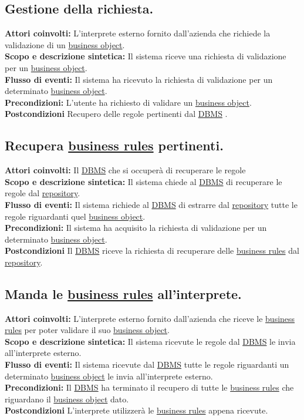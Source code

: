 \subsection{Gestione della richiesta.}
\textbf{Attori coinvolti:} L'interprete esterno fornito dall'azienda che richiede la validazione di un \underline{business object}.\\
\textbf{Scopo e descrizione sintetica:} Il sistema riceve una richiesta di validazione per un \underline{business object}.\\
\textbf{Flusso di eventi:} Il sistema ha ricevuto la richiesta di validazione per un determinato \underline{business object}.\\
\textbf{Precondizioni:} L'utente ha richiesto di validare un \underline{business object}.\\
\textbf{Postcondizioni} Recupero delle regole pertinenti dal \underline{DBMS} .

\subsection{Recupera \underline{business rules} pertinenti.}
\textbf{Attori coinvolti:} Il \underline{DBMS} che si occuper\`a di recuperare le regole\\
\textbf{Scopo e descrizione sintetica:} Il sistema chiede al \underline{DBMS} di recuperare le regole dal \underline{repository}.\\
\textbf{Flusso di eventi:} Il sistema richiede al \underline{DBMS} di estrarre dal \underline{repository} tutte le regole riguardanti quel \underline{business object}.\\
\textbf{Precondizioni:} Il sistema ha acquisito la richiesta di validazione per un determinato \underline{business object}.\\
\textbf{Postcondizioni} Il \underline{DBMS} riceve la richiesta di recuperare delle \underline{business rules} dal \underline{repository}.
\subsection{Manda le \underline{business rules} all'interprete.}
\textbf{Attori coinvolti:} L'interprete esterno fornito dall'azienda che riceve le \underline{business rules} per poter validare il suo \underline{business object}.\\
\textbf{Scopo e descrizione sintetica:} Il sistema ricevute le regole dal \underline{DBMS} le invia all'interprete esterno.\\
\textbf{Flusso di eventi:} Il sistema ricevute dal \underline{DBMS} tutte le regole riguardanti un determinato \underline{business object} le invia all'interprete esterno.\\
\textbf{Precondizioni:} Il \underline{DBMS} ha terminato il recupero di tutte le \underline{business rules} che riguardano il \underline{business object} dato.\\
\textbf{Postcondizioni} L'interprete utilizzer\`a le \underline{business rules} appena ricevute.

